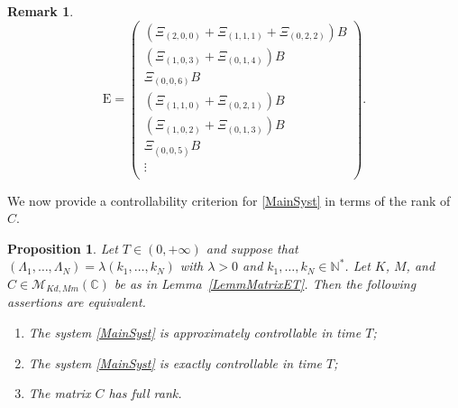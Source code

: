 \documentclass[JEP,XML,SOM,Unicode]{cedram}
\theoremstyle{plain}
\newtheorem{prop}[theo]{Proposition}
\theoremstyle{definition}
\newtheorem{remk}[theo]{Remark}
\newcommand{\Epsilon}{\mathrm E}
\begin{document}
\begin{remk}
\[
\Epsilon =
\begin{pmatrix}
\left(\Xi_{(2, 0, 0)} + \Xi_{(1, 1, 1)} + \Xi_{(0, 2, 2)}\right) B \\
\left(\Xi_{(1, 0, 3)} + \Xi_{(0, 1, 4)}\right) B \\
\Xi_{(0, 0, 6)} B \\
\left(\Xi_{(1, 1, 0)} + \Xi_{(0, 2, 1)}\right) B \\
\left(\Xi_{(1, 0, 2)} + \Xi_{(0, 1, 3)}\right) B \\
\Xi_{(0, 0, 5)} B \\
\vdots \\
\end{pmatrix}.
\]
\end{remk}

We now provide a controllability criterion for \eqref{MainSyst} in terms of the rank of $C$.

\begin{prop}
\label{PropCommET}
Let $T \in (0, +\infty)$ and suppose that $(\Lambda_1, \dots, \Lambda_N) = \lambda (k_1, \dots, k_N)$ with $\lambda > 0$ and $k_1, \dots, k_N \in \mathbb N^\ast$. Let $K$, $M$, and $C \in \mathcal M_{Kd, Mm}(\mathbb C)$ be as in Lemma~\ref{LemmMatrixET}. Then the following assertions are equivalent.
\begin{enumerate}
\item\label{CtrlCommETApprox} The system \eqref{MainSyst} is approximately controllable in time $T$;
\item\label{CtrlCommETExact} The system \eqref{MainSyst} is exactly controllable in time $T$;
\item\label{CtrlCommETKalman} The matrix $C$ has full rank.
\end{enumerate}
\end{prop}
\end{document}
